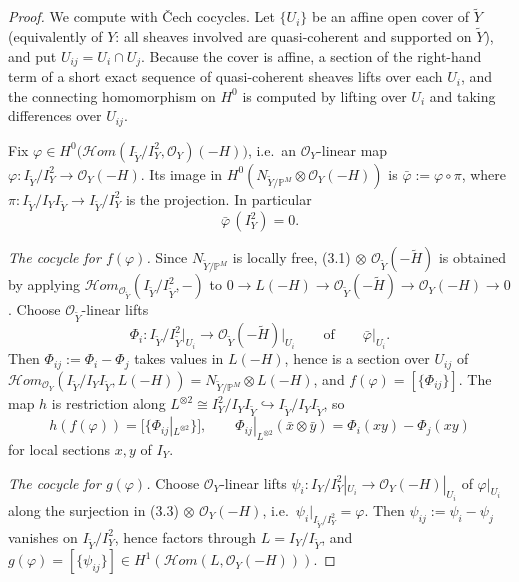 \documentclass[11pt,twoside]{amsart}
\theoremstyle{plain}
\numberwithin{equation}{section}
\theoremstyle{definition}
\begin{document}
\begin{proof}
We compute with \v{C}ech cocycles. Let $\{U_i\}$ be an affine open cover of $\widetilde Y$
(equivalently of $Y$: all sheaves involved are quasi-coherent and supported on $\widetilde Y$),
and put $U_{ij}=U_i\cap U_j$. Because the cover is affine, a section of the right-hand term of a
short exact sequence of quasi-coherent sheaves lifts over each $U_i$, and the connecting
homomorphism on $H^0$ is computed by lifting over $U_i$ and taking differences over $U_{ij}$.

Fix $\varphi\in H^0\big(\mathcal{H}om(I_{\widetilde Y}/I_Y^2,\mathcal{O}_Y)(-H)\big)$, i.e.\ an
$\mathcal{O}_Y$-linear map $\varphi\colon I_{\widetilde Y}/I_Y^2\to\mathcal{O}_Y(-H)$. Its image in
$H^0(N_{\widetilde Y/\mathbb{P}^M}\otimes\mathcal{O}_Y(-H))$ is $\bar\varphi:=\varphi\circ\pi$, where
$\pi\colon I_{\widetilde Y}/I_Y I_{\widetilde Y}\to I_{\widetilde Y}/I_Y^2$ is the projection. In particular
\begin{equation}\label{eq:kill}
\bar\varphi\,(I_Y^2)=0 .
\end{equation}

\emph{The cocycle for $f(\varphi)$.}
Since $N_{\widetilde Y/\mathbb{P}^M}$ is locally free, (3.1)$\,\otimes\,\mathcal{O}_{\widetilde Y}(-\widetilde H)$
is obtained by applying $\mathcal{H}om_{\mathcal{O}_{\widetilde Y}}(I_{\widetilde Y}/I_{\widetilde Y}^2,-)$ to
$0\to L(-H)\to\mathcal{O}_{\widetilde Y}(-\widetilde H)\to\mathcal{O}_Y(-H)\to 0$. Choose
$\mathcal{O}_{\widetilde Y}$-linear lifts
\[
\Phi_i\colon I_{\widetilde Y}/I_{\widetilde Y}^2\big|_{U_i}\longrightarrow
\mathcal{O}_{\widetilde Y}(-\widetilde H)\big|_{U_i}
\qquad\text{of}\qquad \bar\varphi|_{U_i}.
\]
Then $\Phi_{ij}:=\Phi_i-\Phi_j$ takes values in $L(-H)$, hence is a section over $U_{ij}$ of
$\mathcal{H}om_{\mathcal{O}_Y}(I_{\widetilde Y}/I_Y I_{\widetilde Y},L(-H))=N_{\widetilde Y/\mathbb{P}^M}\otimes L(-H)$,
and $f(\varphi)=[\{\Phi_{ij}\}]$. The map $h$ is restriction along
$L^{\otimes 2}\cong I_Y^2/I_Y I_{\widetilde Y}\hookrightarrow I_{\widetilde Y}/I_Y I_{\widetilde Y}$, so
\begin{equation}\label{eq:hf}
h(f(\varphi))=\big[\{\Phi_{ij}|_{L^{\otimes 2}}\}\big],
\qquad
\Phi_{ij}|_{L^{\otimes 2}}(\bar x\otimes\bar y)=\Phi_i(xy)-\Phi_j(xy)
\end{equation}
for local sections $x,y$ of $I_Y$.

\emph{The cocycle for $g(\varphi)$.}
Choose $\mathcal{O}_Y$-linear lifts $\psi_i\colon I_Y/I_Y^2|_{U_i}\to\mathcal{O}_Y(-H)|_{U_i}$ of
$\varphi|_{U_i}$ along the surjection in (3.3)$\,\otimes\,\mathcal{O}_Y(-H)$, i.e.\
$\psi_i|_{I_{\widetilde Y}/I_Y^2}=\varphi$. Then $\psi_{ij}:=\psi_i-\psi_j$ vanishes on
$I_{\widetilde Y}/I_Y^2$, hence factors through $L=I_Y/I_{\widetilde Y}$, and
$g(\varphi)=[\{\psi_{ij}\}]\in H^1(\mathcal{H}om(L,\mathcal{O}_Y(-H)))$.


\end{proof}
\end{document}
